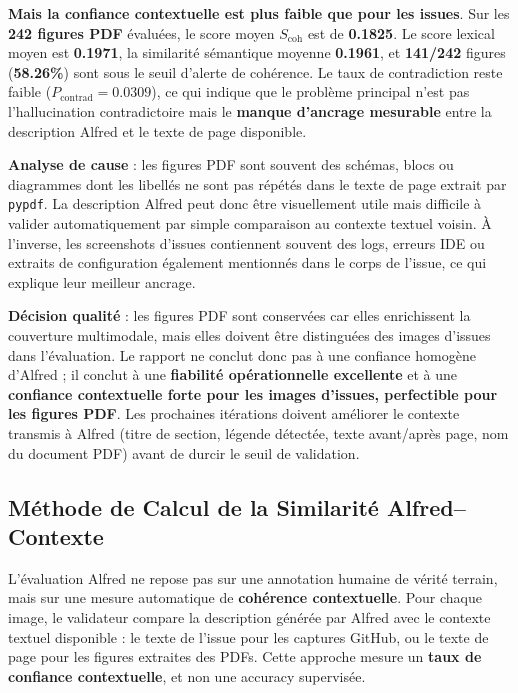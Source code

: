 \documentclass[12pt,a4paper]{report}
\begin{document}
\textbf{Mais la confiance contextuelle est plus faible que pour les issues}. Sur les \textbf{242 figures PDF} évaluées, le score moyen $S_{\text{coh}}$ est de \textbf{0.1825}. Le score lexical moyen est \textbf{0.1971}, la similarité sémantique moyenne \textbf{0.1961}, et \textbf{141/242} figures (\textbf{58.26\%}) sont sous le seuil d'alerte de cohérence. Le taux de contradiction reste faible ($P_{\text{contrad}}=0.0309$), ce qui indique que le problème principal n'est pas l'hallucination contradictoire mais le \textbf{manque d'ancrage mesurable} entre la description Alfred et le texte de page disponible.

\textbf{Analyse de cause} : les figures PDF sont souvent des schémas, blocs ou diagrammes dont les libellés ne sont pas répétés dans le texte de page extrait par \texttt{pypdf}. La description Alfred peut donc être visuellement utile mais difficile à valider automatiquement par simple comparaison au contexte textuel voisin. À l'inverse, les screenshots d'issues contiennent souvent des logs, erreurs IDE ou extraits de configuration également mentionnés dans le corps de l'issue, ce qui explique leur meilleur ancrage.

\textbf{Décision qualité} : les figures PDF sont conservées car elles enrichissent la couverture multimodale, mais elles doivent être distinguées des images d'issues dans l'évaluation. Le rapport ne conclut donc pas à une confiance homogène d'Alfred ; il conclut à une \textbf{fiabilité opérationnelle excellente} et à une \textbf{confiance contextuelle forte pour les images d'issues, perfectible pour les figures PDF}. Les prochaines itérations doivent améliorer le contexte transmis à Alfred (titre de section, légende détectée, texte avant/après page, nom du document PDF) avant de durcir le seuil de validation.

\subsection{Méthode de Calcul de la Similarité Alfred--Contexte}
\label{sec:eval_alfred_similarity_method}

L'évaluation Alfred ne repose pas sur une annotation humaine de vérité terrain, mais sur une mesure automatique de \textbf{cohérence contextuelle}. Pour chaque image, le validateur compare la description générée par Alfred avec le contexte textuel disponible : le texte de l'issue pour les captures GitHub, ou le texte de page pour les figures extraites des PDFs. Cette approche mesure un \textbf{taux de confiance contextuelle}, et non une accuracy supervisée.
\end{document}
